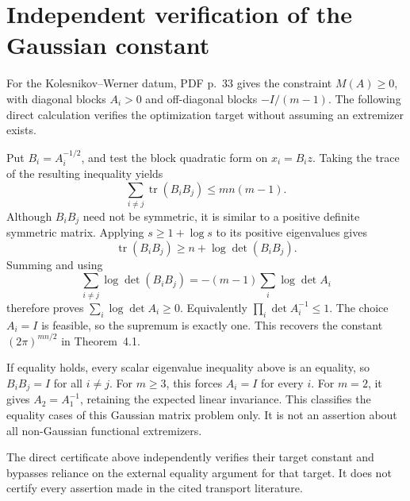 \documentclass[10pt]{article}
\begin{document}
\section*{Independent verification of the Gaussian constant}
For the Kolesnikov–Werner datum, PDF p. 33 gives the constraint \(M(A)\ge0\), with diagonal blocks \(A_i>0\) and off-diagonal blocks \(-I/(m-1)\). The following direct calculation verifies the optimization target without assuming an extremizer exists.\par
Put \(B_i=A_i^{-1/2}\), and test the block quadratic form on \(x_i=B_i z\). Taking the trace of the resulting inequality yields \[\sum_{i\ne j}\operatorname{tr}(B_iB_j)\le mn(m-1).\] Although \(B_iB_j\) need not be symmetric, it is similar to a positive definite symmetric matrix. Applying \(s\ge1+\log s\) to its positive eigenvalues gives \[\operatorname{tr}(B_iB_j)\ge n+\log\det(B_iB_j).\] Summing and using \[\sum_{i\ne j}\log\det(B_iB_j)
   =-(m-1)\sum_i\log\det A_i\] therefore proves \(\sum_i\log\det A_i\ge0\). Equivalently \(\prod_i\det A_i^{-1}\le1\). The choice \(A_i=I\) is feasible, so the supremum is exactly one. This recovers the constant \((2\pi)^{mn/2}\) in Theorem 4.1.\par
If equality holds, every scalar eigenvalue inequality above is an equality, so \(B_iB_j=I\) for all \(i\ne j\). For \(m\ge3\), this forces \(A_i=I\) for every \(i\). For \(m=2\), it gives \(A_2=A_1^{-1}\), retaining the expected linear invariance. This classifies the equality cases of this Gaussian matrix problem only. It is not an assertion about all non-Gaussian functional extremizers.\par
The direct certificate above independently verifies their target constant and bypasses reliance on the external equality argument for that target. It does not certify every assertion made in the cited transport literature.\par
\end{document}
